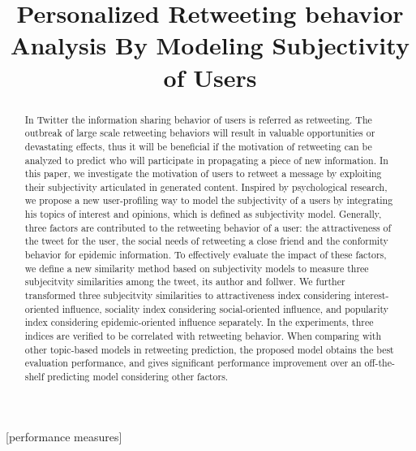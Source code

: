 \documentclass{acm_proc_article-sp}
\newcommand{\mo}[1]{\textcolor{red}{#1}}
\begin{document}
\title{Personalized Retweeting behavior Analysis By Modeling Subjectivity of Users}

\maketitle
\begin{abstract}
In Twitter the information sharing behavior of users is referred as retweeting. The outbreak of large scale retweeting behaviors will result in valuable opportunities or devastating effects, thus it will be beneficial if the motivation of retweeting can be analyzed to predict who will participate in propagating a piece of new information. 
In this paper, we investigate the motivation of users to retweet a message by exploiting their subjectivity articulated in generated content.
Inspired by psychological research, we propose a new user-profiling way to model the subjectivity of a users by integrating his topics of interest and opinions, which is defined as subjectivity model. 
Generally, three factors are contributed to the retweeting behavior of a user: the attractiveness of the tweet for the user, the social needs of retweeting a close friend and the conformity behavior for epidemic information. 
To effectively evaluate the impact of these factors, we define a new similarity method based on subjectivity models to measure three subjecitvity similarities among the tweet, its author and follwer.
We further transformed three subjecitvity similarities to attractiveness index considering interest-oriented influence, sociality index considering social-oriented influence, and popularity index considering epidemic-oriented influence separately.
In the experiments, three indices are verified to be correlated with retweeting behavior. 
When comparing with other topic-based models in retweeting prediction, the proposed model obtains the best evaluation performance, and gives significant performance improvement over an off-the-shelf predicting model considering other factors.
\end{abstract}
[performance measures]
\end{document}
